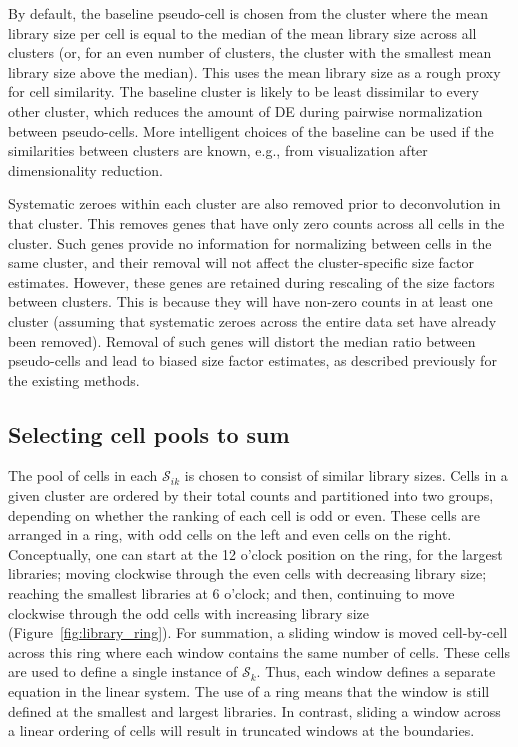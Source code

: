 \documentclass{article}
\begin{document}
By default, the baseline pseudo-cell is chosen from the cluster where the mean library size per cell is equal to the median of the mean library size across all clusters
    (or, for an even number of clusters, the cluster with the smallest mean library size above the median).
This uses the mean library size as a rough proxy for cell similarity.
The baseline cluster is likely to be least dissimilar to every other cluster, which reduces the amount of DE during pairwise normalization between pseudo-cells.
More intelligent choices of the baseline can be used if the similarities between clusters are known, e.g., from visualization after dimensionality reduction.

Systematic zeroes within each cluster are also removed prior to deconvolution in that cluster.
This removes genes that have only zero counts across all cells in the cluster.
Such genes provide no information for normalizing between cells in the same cluster, and their removal will not affect the cluster-specific size factor estimates.
However, these genes are retained during rescaling of the size factors between clusters.
This is because they will have non-zero counts in at least one cluster (assuming that systematic zeroes across the entire data set have already been removed).
Removal of such genes will distort the median ratio between pseudo-cells and lead to biased size factor estimates, as described previously for the existing methods.

\subsection{Selecting cell pools to sum}
The pool of cells in each $\mathcal{S}_{ik}$ is chosen to consist of similar library sizes.
Cells in a given cluster are ordered by their total counts and partitioned into two groups, depending on whether the ranking of each cell is odd or even.
These cells are arranged in a ring, with odd cells on the left and even cells on the right.
Conceptually, one can start at the 12 o'clock position on the ring, for the largest libraries; moving clockwise through the even cells with decreasing library size;
reaching the smallest libraries at 6 o'clock; and then, continuing to move clockwise through the odd cells with increasing library size (Figure~\ref{fig:library_ring}).
For summation, a sliding window is moved cell-by-cell across this ring where each window contains the same number of cells.
These cells are used to define a single instance of $\mathcal{S}_{k}$.
Thus, each window defines a separate equation in the linear system.
The use of a ring means that the window is still defined at the smallest and largest libraries.
In contrast, sliding a window across a linear ordering of cells will result in truncated windows at the boundaries.
\end{document}
